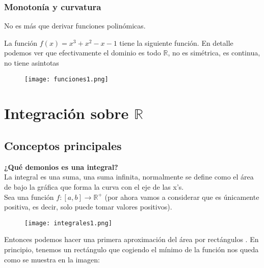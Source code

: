 \subsection*{Monotonía y curvatura}
No es más que derivar funciones polinómicas. 
\newpage
\begin{ejemplo}
La función $f(x)=x^3+x^2-x-1$ tiene la siguiente función.
En detalle podemos ver que efectivamente el dominio es todo $\mathbb{R}$, no es simétrica, es continua, no tiene asintotas 
\end{ejemplo}
\begin{center}
\begin{figure}[H]
\centering
\graphicspath{{imagenes_analisis/representacion}}
\texttt{[image: funciones1.png]}
\end{figure}
\end{center}








\chapter{Integración sobre $\mathbb{R}$}
\minitoc

\newpage

\section{Conceptos principales}
\noindent
\textbf{¿Qué demonios es una integral?}\\[1ex]
La integral es una suma, una suma infinita, normalmente se define como el área de bajo la gráfica que forma la curva con el eje de las x's.\\[2ex]
\noindent
Sea una función $f\colon [a,b] \longrightarrow \mathbb{R}^+$ (por ahora vamos a considerar que es únicamente positiva, es decir, solo puede tomar valores positivos). 
\begin{figure}[H]
\begin{center}
\graphicspath{{imagenes_analisis/}}
\texttt{[image: integrales1.png]}
\label{Función $f(x)$}
\end{center}
\end{figure}

Entonces podemos hacer una primera aproximación del área por rectángulos . En principio, tenemos un rectángulo que cogiendo el mínimo de la función nos queda como se muestra en la imagen:

